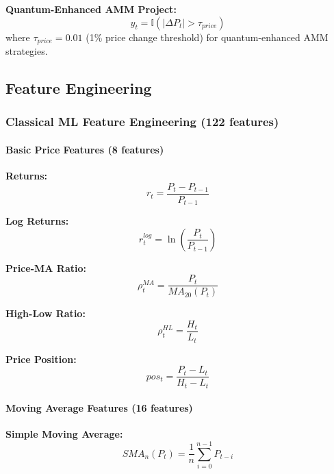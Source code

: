\documentclass[12pt,a4paper]{article}
\begin{document}
\textbf{Quantum-Enhanced AMM Project:}
\begin{equation}
y_t = \mathbb{I}\left(\left|\Delta P_t\right| > \tau_{price}\right)
\end{equation}
where $\tau_{price} = 0.01$ (1\% price change threshold) for quantum-enhanced AMM strategies.

\subsection{Feature Engineering}

\subsubsection{Classical ML Feature Engineering (122 features)}

\paragraph{Basic Price Features (8 features)}

\textbf{Returns:}
\begin{equation}
r_t = \frac{P_t - P_{t-1}}{P_{t-1}}
\end{equation}

\textbf{Log Returns:}
\begin{equation}
r_t^{log} = \ln\left(\frac{P_t}{P_{t-1}}\right)
\end{equation}

\textbf{Price-MA Ratio:}
\begin{equation}
\rho_t^{MA} = \frac{P_t}{MA_{20}(P_t)}
\end{equation}

\textbf{High-Low Ratio:}
\begin{equation}
\rho_t^{HL} = \frac{H_t}{L_t}
\end{equation}

\textbf{Price Position:}
\begin{equation}
pos_t = \frac{P_t - L_t}{H_t - L_t}
\end{equation}

\paragraph{Moving Average Features (16 features)}

\textbf{Simple Moving Average:}
\begin{equation}
SMA_n(P_t) = \frac{1}{n}\sum_{i=0}^{n-1} P_{t-i}
\end{equation}
\end{document}
